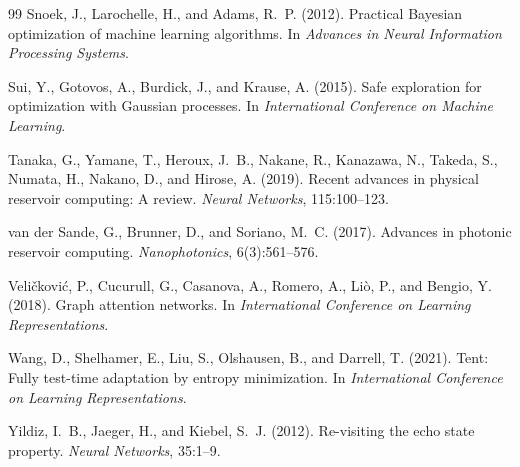 \documentclass[preprint,12pt,authoryear]{elsarticle}
\begin{document}
\begin{thebibliography}{99}
Snoek, J., Larochelle, H., and Adams, R.~P. (2012).
Practical Bayesian optimization of machine learning algorithms.
In \emph{Advances in Neural Information Processing Systems}.

Sui, Y., Gotovos, A., Burdick, J., and Krause, A. (2015).
Safe exploration for optimization with Gaussian processes.
In \emph{International Conference on Machine Learning}.

Tanaka, G., Yamane, T., Heroux, J.~B., Nakane, R., Kanazawa, N., Takeda, S., Numata, H., Nakano, D., and Hirose, A. (2019).
Recent advances in physical reservoir computing: A review.
\emph{Neural Networks}, 115:100--123.

van der Sande, G., Brunner, D., and Soriano, M.~C. (2017).
Advances in photonic reservoir computing.
\emph{Nanophotonics}, 6(3):561--576.

Veli\v{c}kovi\'{c}, P., Cucurull, G., Casanova, A., Romero, A., Li\`o, P., and Bengio, Y. (2018).
Graph attention networks.
In \emph{International Conference on Learning Representations}.

Wang, D., Shelhamer, E., Liu, S., Olshausen, B., and Darrell, T. (2021).
Tent: Fully test-time adaptation by entropy minimization.
In \emph{International Conference on Learning Representations}.

Yildiz, I.~B., Jaeger, H., and Kiebel, S.~J. (2012).
Re-visiting the echo state property.
\emph{Neural Networks}, 35:1--9.

\end{thebibliography}
\end{document}
